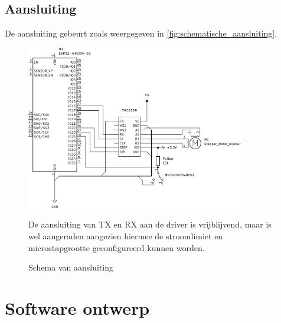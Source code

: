 \subsection{Aansluiting}
De aansluiting gebeurt zoals weergegeven in \autoref{fig:schematische_aansluiting}.
\begin{figure}[H]
    \centering
    \includegraphics[width=0.85\textwidth]{figures/Wiring_BW.png}
    \caption{Schema van aansluiting}\label{fig:schematische_aansluiting}
    De aansluiting van TX en RX aan de driver is vrijblijvend, maar is wel aangeraden aangezien hiermee de stroomlimiet en microstapgrootte geconfigureerd kunnen worden.
\end{figure}

\section{Software ontwerp}

